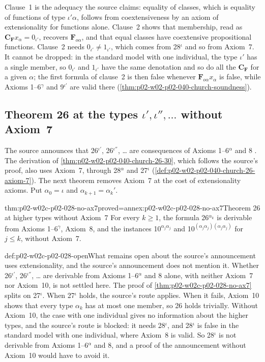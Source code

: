 Clause~1 is the adequacy the source claims: equality of classes, which is
equality of functions of type \(\iota'\alpha\), follows from coextensiveness
by an axiom of extensionality for functions alone.  Clause~2 shows that
membership, read as \(\mathbf C_{\mathbf F}x_\alpha=0_{\iota'}\), recovers
\(\mathbf F_{o\alpha}\), and that equal classes have coextensive
propositional functions.  Clause~2 needs \(0_{\iota'}\ne1_{\iota'}\), which
comes from 28\(^\iota\) and so from Axiom~7.  It cannot be dropped: in the
standard model with one individual, the type \(\iota'\) has a single member,
so \(0_{\iota'}\) and \(1_{\iota'}\) have the same denotation and so do all
the \(\mathbf C_{\mathbf F}\) for a given \(\alpha\); the first formula of
clause~2 is then false whenever \(\mathbf F_{o\alpha}x_\alpha\) is false,
while Axioms 1--6\(^\gamma\) and 9\(^{\iota'}\) are valid there
(\cref{thm:p02-w02-p02-040-church-soundness}).

\subsection{Theorem 26 at the types \(\iota',\iota'',\ldots\) without Axiom~7}

The source announces that 26\(^{\iota'}\), 26\(^{\iota''}\), \ldots{} are
consequences of Axioms 1--6\(^\alpha\) and 8 \cite[\S6, p.~64]{Church1940}.
The derivation of \cref{thm:p02-w02-p02-040-church-26-30}, which follows the
source's proof, also uses Axiom~7, through 28\(^\alpha\) and 27\(^\iota\)
(\cref{def:p02-w02-p02-040-church-26-axiom-7}).  The next theorem removes
Axiom~7 at the cost of extensionality axioms.  Put \(\alpha_0=\iota\) and
\(\alpha_{k+1}=\alpha_k'\).

\begin{hbtheorem}{thm:p02-w02c-p02-028-no-ax7}{proved=annex:p02-w02c-p02-028-no-ax7}{Theorem 26 at higher types without Axiom~7}
For every \(k\ge1\), the formula 26\(^{\alpha_k}\) is derivable from Axioms
1--6\(^\gamma\), Axiom~8, and the instances 10\(^{\alpha_j\alpha_j}\) and
10\(^{(\alpha_j\alpha_j)(\alpha_j\alpha_j)}\) for \(j\le k\), without
Axiom~7.
\end{hbtheorem}

\begin{hbwarning}{def:p02-w02c-p02-028-open}{What remains open about the source's announcement}
 uses extensionality, and the
source's announcement does not mention it.  Whether 26\(^{\iota'}\),
26\(^{\iota''}\), \ldots{} are derivable from Axioms 1--6\(^\alpha\) and 8
alone, with neither Axiom~7 nor Axiom~10, is not settled here.  The proof of
\cref{thm:p02-w02c-p02-028-no-ax7} splits on 27\(^\iota\).  When
27\(^\iota\) holds, the source's route applies.  When it fails, Axiom~10
shows that every type \(\alpha_k\) has at most one member, so 26 holds
trivially.  Without Axiom~10, the case with one individual gives no
information about the higher types, and the source's route is blocked:
it needs 28\(^\iota\), and 28\(^\iota\) is false in the standard model with
one individual, where Axiom~8 is valid.  So 28\(^\iota\) is not derivable
from Axioms 1--6\(^\alpha\) and 8, and a proof of the announcement without
Axiom~10 would have to avoid it.
\end{hbwarning}

